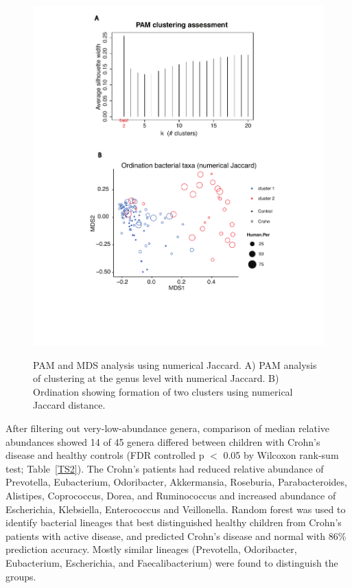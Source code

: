 \begin{figure}[p]
\centering
{\includegraphics[scale=0.62,trim=50 100 0 0,clip]{Figure/F21_Numerical_Jaccard_MDS_Merge.pdf}}
\caption[PAM and MDS analysis using numerical Jaccard]{PAM and MDS analysis using numerical Jaccard. A)  PAM analysis of clustering  at the genus level with numerical Jaccard.  B) Ordination showing formation of two clusters using numerical Jaccard distance. }
\label{F21_Numerical_Jaccard_MDS_Merge}
\end{figure}


After filtering out very-low-abundance genera, comparison of median relative abundances showed 14 of 45 genera differed between children with Crohn's disease and healthy controls (FDR controlled p $<$ 0.05 by Wilcoxon rank-sum test; Table~\ref{TS2}). The Crohn's patients had reduced relative abundance of Prevotella, Eubacterium, Odoribacter, Akkermansia, Roseburia, Parabacteroides, Alistipes, Coprococcus, Dorea, and Ruminococcus and increased abundance of Escherichia, Klebsiella, Enterococcus and Veillonella. Random forest was used to identify bacterial lineages that best distinguished healthy children from Crohn's patients with active disease, and predicted Crohn's disease and normal with 86\% prediction accuracy. Mostly similar lineages (Prevotella, Odoribacter, Eubacterium, Escherichia, and Faecalibacterium) were found to distinguish the groups.



